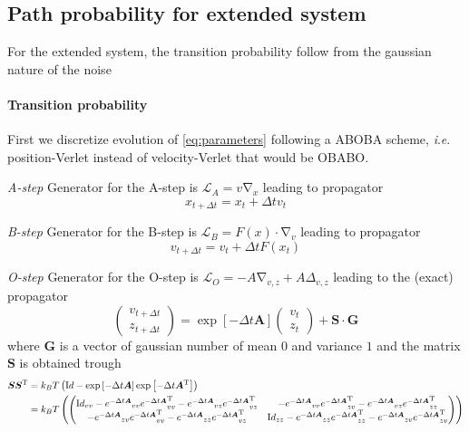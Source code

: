 \documentclass{article}
\numberwithin{equation}{section} %
\newcommand{\Id}{{\textrm Id}}
\renewcommand{\rm}[1]{\mathrm{#1}}%
\newcommand{\T}{\rm{T}}
\newcommand{\ie}{\textit{i}.\textit{e}. }
\DeclareMathOperator{\grad}{\nabla}
\newcommand{\1}{\mathds{1}} %
\begin{document}
\subsection{Path probability for extended system}
For the extended system, the transition probability follow from the gaussian nature of the noise
\paragraph{Transition probability}
First we discretize evolution of \eqref{eq:parameters} following a ABOBA scheme, \ie position-Verlet instead of velocity-Verlet that would be OBABO.

\textit{A-step} Generator for the A-step is $\mathcal{L}_A = v \grad _x$ leading to propagator
\begin{equation}
    \label{eq:propagator_Astep}
    x_{t+\Delta t} = x_t + \Delta t v_t
\end{equation}

\textit{B-step} Generator for the B-step is $\mathcal{L}_B = F(x)\cdot \grad_v$ leading to propagator
\begin{equation}
    \label{eq:propagator_Bstep}
    v_{t+\Delta t} = v_t + \Delta t F(x_t)
\end{equation}

\textit{O-step} Generator for the O-step is $\mathcal{L}_O = - A \grad_{v,z} + A\Delta_{v,z}$ leading to the (exact) propagator
\begin{equation}
    \label{eq:propagator_Ostep}
   \begin{pmatrix} v_{t+\Delta t} \\ z_{t+\Delta t}  \end{pmatrix} = \exp\left[- \Delta t \bm{A} \right]\begin{pmatrix} v_{t} \\ z_{t}  \end{pmatrix} + \bm{S}  \cdot \bm{G} 
\end{equation}
where $\bm{G}$ is a vector of gaussian number of mean 0 and variance $1$ and the matrix $\bm{S}$ is obtained trough
\begin{align}
    \label{eq:FDT_OStep}
    \bm{S}\bm{S}^\T &= k_B T \left( \Id - \exp\left[- \Delta t \bm{A} \right]\exp\left[- \Delta t \bm{A}^\T \right]\right) \\
    &= k_B T \left( \begin{pmatrix} \Id_{vv} - {e^{- \Delta t \bm{A}}}_{vv}{e^{- \Delta t \bm{A}}}_{vv}^\T -{e^{- \Delta t \bm{A}}}_{vz}{e^{- \Delta t \bm{A}}}_{vz}^\T& -{e^{- \Delta t \bm{A}}}_{vv}{e^{- \Delta t \bm{A}}}_{zv}^\T-{e^{- \Delta t \bm{A}}}_{vz}{e^{- \Delta t \bm{A}}}_{zz}^\T  \\
    - {e^{- \Delta t \bm{A}}}_{zv}{e^{- \Delta t \bm{A}}}_{vv}^\T -{e^{- \Delta t \bm{A}}}_{zz}{e^{- \Delta t \bm{A}}}_{vz}^\T& \Id_{zz} -  {e^{- \Delta t \bm{A}}}_{zz}{e^{- \Delta t \bm{A}}}_{zz}^\T -{e^{- \Delta t \bm{A}}}_{zv}{e^{- \Delta t \bm{A}}}_{zv}^\T\\
    \end{pmatrix}\right)
\end{align}
\end{document}
